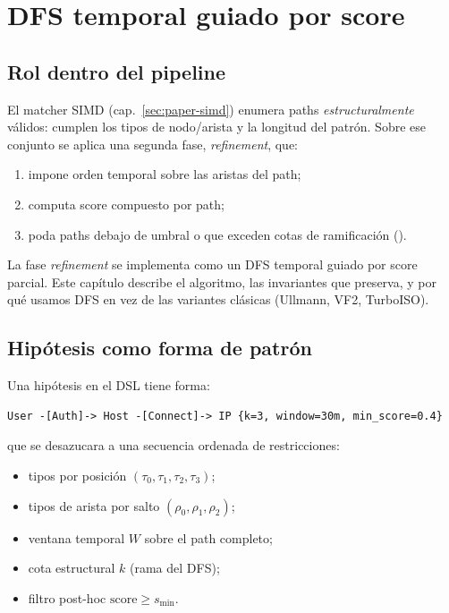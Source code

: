 \chapter{DFS temporal guiado por score}
\label{sec:paper-dfs}

\section{Rol dentro del pipeline}

El matcher SIMD (cap.~\ref{sec:paper-simd}) enumera paths
\emph{estructuralmente} válidos: cumplen los tipos de nodo/arista
y la longitud del patrón. Sobre ese conjunto se aplica una segunda
fase, \emph{refinement}, que:

\begin{enumerate}
    \item impone orden temporal sobre las aristas del path;
    \item computa score compuesto por path;
    \item poda paths debajo de umbral o que exceden cotas de
    ramificación ().
\end{enumerate}

La fase \emph{refinement} se implementa como un DFS temporal
guiado por score parcial. Este capítulo describe el algoritmo, las
invariantes que preserva, y por qué usamos DFS en vez de las
variantes clásicas (Ullmann, VF2, TurboISO).

\section{Hipótesis como forma de patrón}

Una hipótesis en el DSL tiene forma:

\begin{lstlisting}[basicstyle=\ttfamily\small]
User -[Auth]-> Host -[Connect]-> IP {k=3, window=30m, min_score=0.4}
\end{lstlisting}

que se desazucara a una secuencia ordenada de restricciones:

\begin{itemize}
    \item tipos por posición $(\tau_0, \tau_1, \tau_2, \tau_3)$;
    \item tipos de arista por salto $(\rho_0, \rho_1, \rho_2)$;
    \item ventana temporal $W$ sobre el path completo;
    \item cota estructural $k$ (rama del DFS);
    \item filtro post-hoc $\text{score} \ge s_{\min}$.
\end{itemize}

